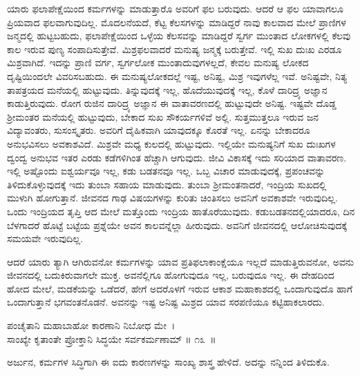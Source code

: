 ಯಾರು ಫಲಾಪೇಕ್ಷೆಯಿಂದ ಕರ್ಮಗಳನ್ನು ಮಾಡುತ್ತಾರೊ ಅವರಿಗೆ ಫಲ ಬರುವುದು. ಆದರೆ ಆ ಫಲ ಯಾವಾಗಲೂ ಪ್ರಿಯವಾದ ಫಲವಾಗುವುದಿಲ್ಲ. ಮೊದಲನೆಯದೆ, ಕೆಟ್ಟ ಕೆಲಸಗಳನ್ನು ಮಾಡಿದ್ದರೆ ನಾವು ಕಾಲವಾದ ಮೇಲೆ ಪ್ರಾಣಿಗಳ ಜನ್ಮದಲ್ಲಿ ಹುಟ್ಟಬಹುದು, ಫಲಾಪೇಕ್ಷೆಯಿಂದ ಒಳ್ಳೆಯ ಕೆಲಸವನ್ನು ಮಾಡಿದ್ದರೆ ಸ್ವರ್ಗ ಮುಂತಾದ ಲೋಕಗಳಲ್ಲಿ ಕೆಲವು ಕಾಲ ಇರುವ ಪುಣ್ಯ ಸಂಪಾದಿಸುತ್ತೇವೆ. ಮಿಶ್ರಫಲವಾದರೆ ಮನುಷ್ಯ ಜನ್ಮಕ್ಕೆ ಬರುತ್ತೇವೆ. ಇಲ್ಲಿ ಸುಖ ದುಃಖ ಎರಡೂ ಮಿಶ್ರವಾಗಿದೆ. ಇದನ್ನು ಪ್ರಾಣಿ ವರ್ಗ, ಸ್ವರ್ಗಲೋಕ ಮುಂತಾದುವುಗಳಲ್ಲದೆ, ಕೇವಲ ಮನುಷ್ಯ ಲೋಕದ ದೃಷ್ಟಿಯಿಂದಲೇ ವಿವರಿಸಬಹುದು. ಈ ಮನುಷ್ಯಲೋಕದಲ್ಲೆ ಇಷ್ಟ, ಅನಿಷ್ಟ, ಮಿಶ್ರ ಇವುಗಳೆಲ್ಲ ಇವೆ. ಅನಿಷ್ಟವೇ, ನಿತ್ಯ ತಾಪತ್ರಯದ ಮನೆಯಲ್ಲಿ ಹುಟ್ಟುವುದು. ತಿನ್ನುವುದಕ್ಕೆ ಇಲ್ಲ, ಹೊದೆಯುವುದಕ್ಕೆ ಇಲ್ಲ, ಕೊಳೆ ದಾರಿದ್ರ್ಯ ಅಜ್ಞಾನ ಕಾಡುತ್ತಿರುವುದು. ರೋಗ ರುಜಿನ ದಾರಿದ್ರ್ಯ ಅಜ್ಞಾನ ಈ ವಾತಾವರಣದಲ್ಲಿ ಹುಟ್ಟುವುದೇ ಅನಿಷ್ಟ. ಇಷ್ಟವೇ ದೊಡ್ಡ ಶ‍್ರೀಮಂತರ ಮನೆಯಲ್ಲಿ ಹುಟ್ಟುವುದು, ಬೇಕಾದ ಸುಖ ಸೌಕರ್ಯಗಳಿವೆ ಅಲ್ಲಿ. ಸುತ್ತಮುತ್ತಲೂ ಇರುವ ಜನ ವಿದ್ಯಾವಂತರು, ಸುಸಂಸ್ಕೃತರು. ಅವರಿಗೆ ದೈಹಿಕವಾಗಿ ಯಾವುದಕ್ಕೂ ಕೊರತೆ ಇಲ್ಲ. ಏನನ್ನು ಬೇಕಾದರೂ ಅನುಭವಿಸಲು ಅವಕಾಶವಿದೆ. ಮಿಶ್ರವೇ ಮಧ್ಯ ಕುಲದಲ್ಲಿ ಹುಟ್ಟುವುದು. ಇಲ್ಲಿಯೇ ಮನುಷ್ಯನಿಗೆ ಸುಖ ದುಃಖಗಳ ದ್ವಂದ್ವ ಅನುಭವ ಇತರ ಎರಡು ಕಡೆಗಳಿಗಿಂತ ಹೆಚ್ಚಾಗಿ ಆಗುವುದು. ಜೀವಿ ವಿಕಾಸಕ್ಕೆ ಇದು ಸರಿಯಾದ ವಾತಾವರಣ. ಇಲ್ಲಿ ಅಷ್ಟೊಂದು ಐಶ್ವರ್ಯವೂ ಇಲ್ಲ, ಕಡು ಬಡತನವೂ ಇಲ್ಲ. ಒಬ್ಬ ವಿಚಾರ ಮಾಡುವುದಕ್ಕೆ, ಪ್ರಪಂಚವನ್ನು ತಿಳಿದುಕೊಳ್ಳುವುದಕ್ಕೆ ಇದು ತುಂಬಾ ಸಹಾಯ ಮಾಡುವುದು. ತುಂಬಾ ಶ‍್ರೀಮಂತನಾದರೆ, ಇಂದ್ರಿಯ ಸುಖದಲ್ಲಿ ಮುಳುಗಿ ಹೋಗುತ್ತಾನೆ. ಜೀವನದ ಗಾಢ ವಿಷಯಗಳನ್ನು ಕುರಿತು ಚಿಂತಿಸಲು ಅವನಿಗೆ ಅವಕಾಶವೇ ಇರುವುದಿಲ್ಲ. ಒಂದು ಇಂದ್ರಿಯದ ತೃಪ್ತಿ ಆದ ಮೇಲೆ ಮತ್ತೊಂದು ಇಂದ್ರಿಯ ಹಾತೊರೆಯುವುದು. ಕಡುಬಡತನದಲ್ಲಿಯಾದರೂ, ದಿನ ಬೆಳಗಾದರೆ ಹೊಟ್ಟೆ ಬಟ್ಟೆಯ ಪ್ರಶ್ನೆಯೇ ಅವನ ಕಾಲವನ್ನೆಲ್ಲಾ ಹೀರುವುದು. ಅವನಿಗೆ ಜೀವನದಲ್ಲಿ ಆಲೋಚಿಸುವುದಕ್ಕೆ ಸಮಯವೇ ಇರುವುದಿಲ್ಲ.

ಆದರೆ ಯಾರು ತ್ಯಾಗಿ ಆಗಿರುವನೋ ಕರ್ಮಗಳನ್ನು ಯಾವ ಪ್ರತಿಫಲಾಕಾಂಕ್ಷೆಯೂ ಇಲ್ಲದೆ ಮಾಡುತ್ತಿರುವನೋ, ಅವನು ಜೀವನದಲ್ಲಿ ಬದುಕಿರುವಾಗಲೇ ಮುಕ್ತ. ಅವನೆಲ್ಲಿಗೂ ಹೋಗು\-ವುದೂ ಇಲ್ಲ, ಬರುವುದೂ ಇಲ್ಲ. ಈ ದೇಹದಿಂದ ಹೋದ ಮೇಲೆ, ಮಡಕೆಯನ್ನು ಒಡೆದರೆ, ಹೇಗೆ ಅದರೊಳಗೆ ಇರುವ ಆಕಾಶ ಮಹಾಕಾಶದಲ್ಲಿ ಒಂದಾಗುವುದೊ ಹಾಗೆ ಒಂದಾಗುತ್ತಾನೆ ಭಗವಂತನೊಡನೆ. ಅವನನ್ನು ಇಷ್ಟ ಅನಿಷ್ಟ ಮಿಶ್ರದ ಯಾವ ಸರಪಣಿಯೂ ಕಟ್ಟಿಹಾಕಲಾರದು.

\begin{shloka}
ಪಂಚೈತಾನಿ ಮಹಾಬಾಹೋ ಕಾರಣಾನಿ ನಿಬೋಧ ಮೇ~।\\ಸಾಂಖ್ಯೇ ಕೃತಾಂತೇ ಪ್ರೋಕ್ತಾನಿ ಸಿದ್ಧಯೇ ಸರ್ವಕರ್ಮಣಾಮ್ \hfill॥ ೧೩~॥
\end{shloka}

\begin{artha}
ಅರ್ಜುನ, ಕರ್ಮಗಳ ಸಿದ್ಧಿಗಾಗಿ ಈ ಐದು ಕಾರಣಗಳನ್ನು ಸಾಂಖ್ಯ ಶಾಸ್ತ್ರ ಹೇಳಿದೆ. ಅದನ್ನು ನನ್ನಿಂದ ತಿಳಿದುಕೊ.
\end{artha}

